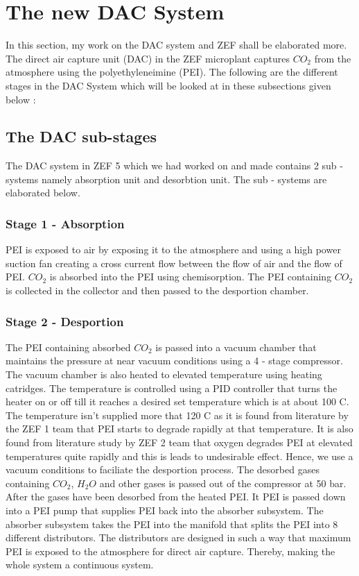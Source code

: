 \section{The new DAC System}

In this section, my work on the DAC system and ZEF shall be elaborated more. The direct air capture unit (DAC) in the ZEF microplant captures $CO_2$ from the atmosphere using the polyethyleneimine (PEI). The following are the different stages in the DAC System which will be looked at in these subsections given below :

\subsection{The DAC sub-stages}

The DAC system in ZEF 5 which we had worked on and made contains 2 sub - systems namely absorption unit and desorbtion unit. The sub - systems are elaborated below. 

\subsubsection{Stage 1 - Absorption}
PEI is exposed to air by exposing it to the atmosphere and using a high power suction fan creating a cross current flow between the flow of air and the flow of PEI. $CO_2$ is absorbed into the PEI using chemisorption. The PEI containing $CO_2$ is collected in the collector and then passed to the desportion chamber. 

\subsubsection{Stage 2 - Desportion}

The PEI containing absorbed $CO_2$ is passed into a vacuum chamber that maintains the pressure at near vacuum conditions using a 4 - stage compressor. The vacuum chamber is also heated to elevated temperature using heating catridges. The temperature is controlled using a PID controller that turns the heater on or off till it reaches a desired set temperature which is at about 100 \degree C. The temperature isn't supplied more that 120 \degree C as it is found from literature by the ZEF 1 team that PEI starts to degrade rapidly at that temperature. 
\bigbreak \noindent
It is also found from literature study by ZEF 2 team that oxygen degrades PEI at elevated temperatures quite rapidly and this is leads to undesirable effect. Hence, we use a vacuum conditions to faciliate the desportion process. The desorbed gases containing $CO_2$, $H_2O$ and other gases is passed out of the compressor at 50 bar.
\bigbreak \noindent
After the gases have been desorbed from the heated PEI. It PEI is passed down into a PEI pump that supplies PEI back into the absorber subsystem. The absorber subsystem takes the PEI into the manifold that splits the PEI into 8 different distributors. The distributors are designed in such a way that maximum PEI is exposed to the atmosphere for direct air capture. Thereby, making the whole system a continuous system.

